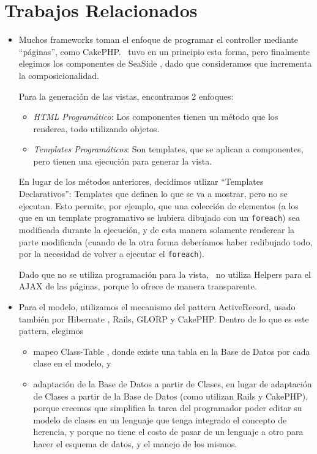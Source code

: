 \section{Trabajos Relacionados}

\begin{itemize}
\item Muchos frameworks toman el enfoque de programar el controller mediante ``páginas'', como CakePHP. \PWB \ tuvo en un principio esta forma, pero finalmente elegimos los componentes de SeaSide \cite{seaside}\cite{Duca04e}, dado que consideramos que incrementa la composicionalidad.


Para la generación de las vistas, encontramos 2 enfoques:
\begin{itemize}
\item \emph{HTML Programático}: Los componentes tienen un método que los renderea, todo utilizando objetos.
\item \emph{Templates Programáticos}: Son templates, que se aplican a componentes, pero tienen una ejecución para generar la vista.
\end{itemize}
En lugar de los métodos anteriores, decidimos utlizar ``Templates Declarativos'': Templates que definen lo que se va a mostrar, pero no se ejecutan. Esto permite, por ejemplo, que una colección de elementos (a los que en un template programativo se hubiera dibujado con un \verb"foreach") sea modificada durante la ejecución, y de esta manera solamente renderear la parte modificada (cuando de la otra forma deberíamos haber redibujado todo, por la necesidad de volver a ejecutar el \verb"foreach").

Dado que no se utiliza programación para la vista, \PWB \ no utiliza Helpers para el AJAX de las páginas, porque lo ofrece de manera transparente.

\item Para el modelo, utilizamos el mecanismo del pattern ActiveRecord, usado también por Hibernate \cite{hibernate}, Rails, GLORP y CakePHP. Dentro de lo que es este pattern, elegimos
\begin{itemize}
\item mapeo Class-Table \cite{classtable}, donde existe una tabla en la Base de Datos por cada clase en el modelo, y
\item adaptación de la Base de Datos a partir de Clases, en lugar de adaptación de Clases a partir de la Base de Datos (como utilizan Rails y CakePHP), porque creemos que simplifica la tarea del programador poder editar su modelo de clases en un lenguaje que tenga integrado el concepto de herencia, y porque no tiene el costo de pasar de un lenguaje a otro para hacer el esquema de datos, y el manejo de los mismos.
\end{itemize}


\end{itemize}
